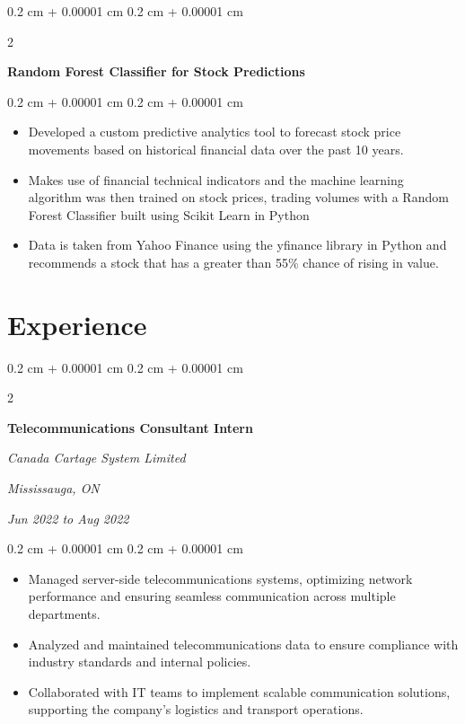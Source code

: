 \documentclass[10pt, letterpaper]{article}
\newenvironment{highlights}{
    \begin{itemize}[
        topsep=0.10 cm,
        parsep=0.10 cm,
        partopsep=0pt,
        itemsep=0pt,
        leftmargin=0.4 cm + 10pt
    ]
}{
    \end{itemize}
} %
\newenvironment{onecolentry}{
    \begin{adjustwidth}{
        0.2 cm + 0.00001 cm
    }{
        0.2 cm + 0.00001 cm
    }
}{
    \end{adjustwidth}
} %
\newenvironment{twocolentry}[2][]{
    \onecolentry
    \def\secondColumn{#2}
    \setcolumnwidth{\fill, 4.5 cm}
    \begin{paracol}{2}
}{
    \switchcolumn \raggedleft \secondColumn
    \end{paracol}
    \endonecolentry
} %
\let\hrefWithoutArrow\href
\renewcommand{\href}[2]{\hrefWithoutArrow{#1}{\ifthenelse{\equal{#2}{}}{ }{#2 }\raisebox{.15ex}{\footnotesize \faExternalLink*}}}
\begin{document}
        \vspace{0.2 cm}

        \begin{twocolentry}{
            
            
        \textit{\href{https://github.com/akramj13/ai-stock-predictor}{GitHub Link}}}
            \textbf{Random Forest Classifier for Stock Predictions}
        \end{twocolentry}

        \vspace{0.10 cm}
        \begin{onecolentry}
            \begin{highlights}
                \item Developed a custom predictive analytics tool to forecast stock price movements based on historical financial data over the past 10 years.
                \item Makes use of financial technical indicators and the machine learning algorithm was then trained on stock prices, trading volumes with a Random Forest Classifier built using Scikit Learn in Python
                \item Data is taken from Yahoo Finance using the yfinance library in Python and recommends a stock that has a greater than 55\% chance of rising in value.
            \end{highlights}
        \end{onecolentry}



    
    \section{Experience}



        
        \begin{twocolentry}{
        \textit{Mississauga, ON}    
            
        \textit{Jun 2022 to Aug 2022}}
            \textbf{Telecommunications Consultant Intern}
            
            \textit{Canada Cartage System Limited}
        \end{twocolentry}

        \vspace{0.10 cm}
        \begin{onecolentry}
            \begin{highlights}
                \item Managed server-side telecommunications systems, optimizing network performance and ensuring seamless communication across multiple departments.
                \item Analyzed and maintained telecommunications data to ensure compliance with industry standards and internal policies.
                \item Collaborated with IT teams to implement scalable communication solutions, supporting the company's logistics and transport operations.
            \end{highlights}
        \end{onecolentry}
\end{document}
